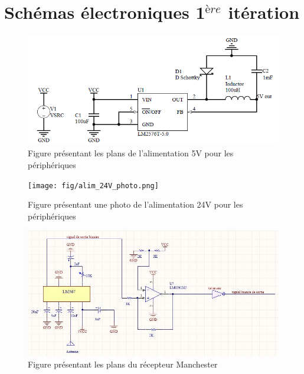 


\chapter{Schémas électroniques 1$^{ère}$ itération}
\label{electronics}

\begin{figure}[htbp]
\centering
\includegraphics[scale=0.5]{fig/alim_5V.png}
\caption{Figure présentant les plans de l'alimentation 5V pour les périphériques}
\label{fig:alim5V}
\end{figure}

\begin{figure}[htbp]
\centering
\texttt{[image: fig/alim\_24V\_photo.png]}
\caption{Figure présentant une photo de l'alimentation 24V pour les périphériques}
\label{fig:alim24Vphoto}
\end{figure}

\begin{figure}[htbp]
\centering
\includegraphics[scale=0.5]{fig/circuit_manchester.jpg}
\caption{Figure présentant les plans du récepteur Manchester}
\label{fig:manchester}
\end{figure}

